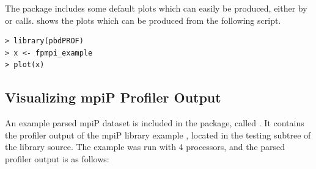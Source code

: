 The package includes some default plots which can easily be produced, either by  or  calls.   shows the plots which can be produced from the following script.
\begin{lstlisting}[language=rr]
> library(pbdPROF)
> x <- fpmpi_example
> plot(x)
\end{lstlisting}


\subsection{Visualizing mpiP Profiler Output}

An example parsed mpiP dataset is included in the  package, called .  It contains the profiler output of the mpiP library example , located in the testing subtree of the library source.  The example was run with 4 processors, and the parsed profiler output is as follows:
